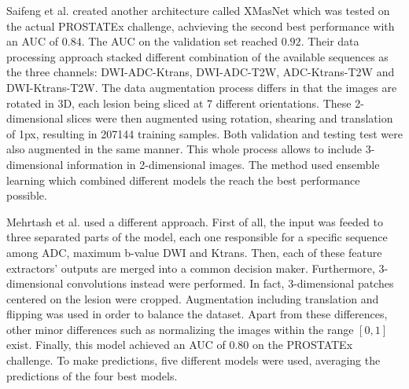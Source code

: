 Saifeng et al. \cite{31} created another architecture called XMasNet which was tested on the actual PROSTATEx challenge, achvieving the second best performance with an AUC of $0.84$. The AUC on the validation set reached $0.92$. Their data processing approach stacked different combination of the available sequences as the three channels: DWI-ADC-Ktrans, DWI-ADC-T2W, ADC-Ktrans-T2W and DWI-Ktrans-T2W. The data augmentation process differs in that the images are rotated in 3D, each lesion being sliced at 7 different orientations. These 2-dimensional slices were then augmented using rotation, shearing and translation of 1px, resulting in 207144 training samples. Both validation and testing test were also augmented in the same manner. This whole process allows to include 3-dimensional information in 2-dimensional images. The method used ensemble learning which combined different models the reach the best performance possible. 

Mehrtash et al. \cite{01} used a different approach. First of all, the input was feeded to three separated parts of the model, each one responsible for a specific sequence among ADC, maximum b-value DWI and Ktrans. Then, each of these feature extractors' outputs are merged into a common decision maker. Furthermore, 3-dimensional convolutions instead were performed. In fact, 3-dimensional patches centered on the lesion were cropped. Augmentation including translation and flipping was used in order to balance the dataset. Apart from these differences, other minor differences such as normalizing the images within the range $[0,1]$ exist. Finally, this model achieved an AUC of $0.80$ on the PROSTATEx challenge. To make predictions, five different models were used, averaging the predictions of the four best models. 